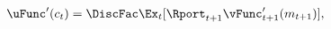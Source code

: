 \unskip
  \begin{equation}\begin{gathered}\begin{aligned}
        \uFunc^{\prime}({c}_{t})  & = \DiscFac \Ex_{t} [{\Rport}_{t+1} \vFunc^{\prime}_{t+1}({m}_{t+1})] \label{eq:valfuncFOCRtilde},
      \end{aligned}\end{gathered}\end{equation}
